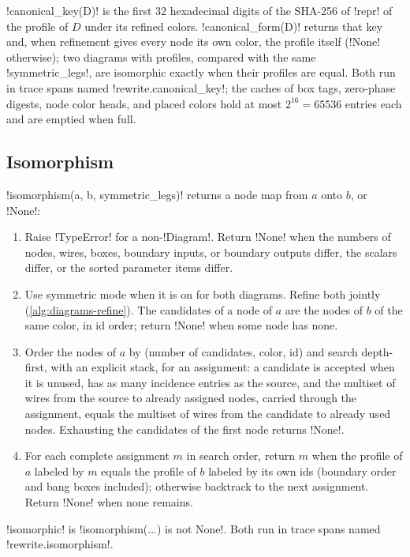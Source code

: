 \py!canonical_key(D)! is the first 32 hexadecimal digits of the SHA-256 of \py!repr! of the profile of $D$ under its refined colors. \py!canonical_form(D)! returns that key and, when refinement gives every node its own color, the profile itself (\py!None! otherwise); two diagrams with profiles, compared with the same \py!symmetric_legs!, are isomorphic exactly when their profiles are equal. Both run in trace spans named \code!rewrite.canonical_key!; the caches of box tags, zero-phase digests, node color heads, and placed colors hold at most $2^{16}=65536$ entries each and are emptied when full.

\subsection{Isomorphism}

\begin{algorithm}[Isomorphism]\label{alg:diagrams-iso}
\py!isomorphism(a, b, symmetric_legs)! returns a node map from $a$ onto $b$, or \py!None!:
\begin{enumerate}
\item Raise \py!TypeError! for a non-\py!Diagram!. Return \py!None! when the numbers of nodes, wires, boxes, boundary inputs, or boundary outputs differ, the scalars differ, or the sorted parameter items differ.
\item Use symmetric mode when it is on for both diagrams. Refine both jointly (\cref{alg:diagrams-refine}). The candidates of a node of $a$ are the nodes of $b$ of the same color, in id order; return \py!None! when some node has none.
\item Order the nodes of $a$ by (number of candidates, color, id) and search depth-first, with an explicit stack, for an assignment: a candidate is accepted when it is unused, has as many incidence entries as the source, and the multiset of wires from the source to already assigned nodes, carried through the assignment, equals the multiset of wires from the candidate to already used nodes. Exhausting the candidates of the first node returns \py!None!.
\item For each complete assignment $m$ in search order, return $m$ when the profile of $a$ labeled by $m$ equals the profile of $b$ labeled by its own ids (boundary order and bang boxes included); otherwise backtrack to the next assignment. Return \py!None! when none remains.
\end{enumerate}
\py!isomorphic! is \py!isomorphism(...) is not None!. Both run in trace spans named \code!rewrite.isomorphism!.
\end{algorithm}
\egroup
